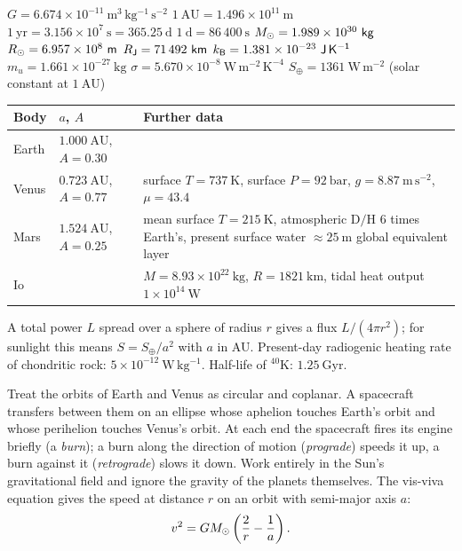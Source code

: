 \begin{given}
$G = 6.674 \times 10^{-11}\ \mathrm{m^3\,kg^{-1}\,s^{-2}}$ \quad
$1\ \mathrm{AU} = 1.496 \times 10^{11}\ \mathrm{m}$ \quad
$1\ \mathrm{yr} = 3.156 \times 10^{7}\ \mathrm{s} = 365.25\ \mathrm{d}$ \quad
$1\ \mathrm{d} = 86\,400\ \mathrm{s}$ \quad
$\Msun = 1.989 \times 10^{30}\ \mathrm{kg}$ \quad
$R_{\odot} = 6.957 \times 10^{8}\ \mathsf{m}$ \quad
$\Rjup = 71\,492\ \mathrm{km}$ \quad
$k_{\mathsf{B}} = 1.381 \times 10^{-23}\ \mathsf{J\,K^{-1}}$ \quad
$m_u = 1.661 \times 10^{-27}\ \mathrm{kg}$ \quad
$\sigma = 5.670 \times 10^{-8}\ \mathrm{W\,m^{-2}\,K^{-4}}$ \quad
$S_\oplus = 1361\ \mathrm{W\,m^{-2}}$ (solar constant at $1\ \mathrm{AU}$)

\vskip6pt
\begin{tabular}{@{}llp{8.2cm}@{}}
\toprule
Body & $a$, $A$ & Further data \\
\midrule
Earth & $1.000\ \mathrm{AU}$, $A = 0.30$ & \\
Venus & $0.723\ \mathrm{AU}$, $A = 0.77$ & surface $T = 737\ \mathrm{K}$, surface $P = 92\ \mathrm{bar}$, $g = 8.87\ \mathrm{m\,s^{-2}}$, $\mu = 43.4$ \\
Mars & $1.524\ \mathrm{AU}$, $A = 0.25$ & mean surface $T = 215\ \mathrm{K}$, atmospheric $\mathrm{D/H}$ 6 times Earth's, present surface water $\approx 25\ \mathrm{m}$ global equivalent layer \\
Io & & $M = 8.93 \times 10^{22}\ \mathrm{kg}$, $R = 1821\ \mathrm{km}$, tidal heat output $1 \times 10^{14}\ \mathrm{W}$ \\
\bottomrule
\end{tabular}

\vskip4pt
{\footnotesize A total power $L$ spread over a sphere of radius $r$ gives a flux $L/(4\pi r^2)$; for sunlight this means $S = S_\oplus/a^2$ with $a$ in AU.
Present-day radiogenic heating rate of chondritic rock: $5 \times 10^{-12}\ \mathrm{W\,kg^{-1}}$.
Half-life of $^{40}\mathrm{K}$: $1.25\ \mathrm{Gyr}$.}
\end{given}



Treat the orbits of Earth and Venus as circular and coplanar.
A spacecraft transfers between them on an ellipse whose aphelion touches Earth's orbit and whose perihelion touches Venus's orbit.
At each end the spacecraft fires its engine briefly (a \emph{burn}); a burn along the direction of motion (\emph{prograde}) speeds it up, a burn against it (\emph{retrograde}) slows it down.
Work entirely in the Sun's gravitational field and ignore the gravity of the planets themselves.
The vis-viva equation gives the speed at distance $r$ on an orbit with semi-major axis $a$:
\[
  v^2 = G M_{\odot} \left( \frac{2}{r} - \frac{1}{a} \right).
\]

